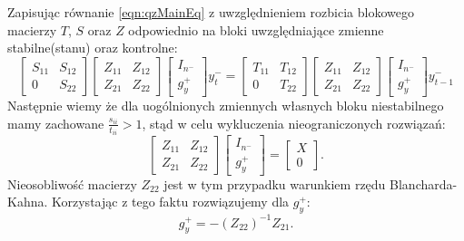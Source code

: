 Zapisując równanie \eqref{eqn:qzMainEq} z uwzględnieniem rozbicia blokowego macierzy $T$, $S$ oraz $Z$ odpowiednio na bloki uwzględniające zmienne stabilne(stanu) oraz kontrolne:
\begin{equation}
    \label{eqn:qzMainBlockEq}
    \begin{bmatrix}
    S_{11} & S_{12} \\
    0 & S_{22}
    \end{bmatrix}
    \begin{bmatrix}
    Z_{11} & Z_{12} \\
    Z_{21} & Z_{22}
    \end{bmatrix}
    \begin{bmatrix}
        I_{n^-} \\
        g_y^+
    \end{bmatrix}  y_t^- = \begin{bmatrix}
    T_{11} & T_{12} \\
    0 & T_{22}
    \end{bmatrix} 
    \begin{bmatrix}
    Z_{11} & Z_{12} \\
    Z_{21} & Z_{22}
    \end{bmatrix}
    \begin{bmatrix}
        I_{n^-} \\
        g_y^+
    \end{bmatrix} y^-_{t-1}
\end{equation}
Następnie wiemy że dla uogólnionych zmiennych własnych bloku niestabilnego mamy zachowane $\frac{s_{ii}}{t_{ii}} > 1$, stąd w celu wykluczenia nieograniczonych rozwiązań:
\begin{equation}
    \label{eqn:qzNoExplosiveTraj}
    \begin{bmatrix}
    Z_{11} & Z_{12} \\
    Z_{21} & Z_{22}
    \end{bmatrix}
    \begin{bmatrix}
        I_{n^-} \\
        g_y^+
    \end{bmatrix} = \begin{bmatrix}
        X \\
        0
    \end{bmatrix}.
\end{equation}
Nieosobliwość macierzy $Z_{22}$ jest w tym przypadku warunkiem rzędu Blancharda-Kahna. Korzystając z tego faktu rozwiązujemy dla $g_y^+$:
\begin{equation}
    \label{eq:bk_general_solve_plus}
    g_y^+ = - (Z_{22})^{-1} Z_{21}.
\end{equation}
